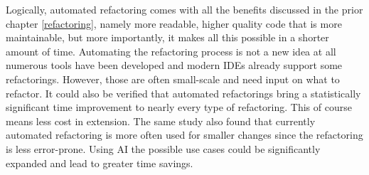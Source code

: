 Logically, automated refactoring comes with all the benefits discussed in the prior chapter \ref{refactoring}, namely more readable, higher quality code that is more maintainable, but more importantly, it makes all this possible in a shorter amount of time. \cite{negara2012using}
Automating the refactoring process is not a new idea at all numerous tools have been developed and modern IDEs already support some refactorings. However, those are often small-scale and need input on what to refactor. \cite{usedisuserefactor}
It could also be verified that automated refactorings bring a statistically significant time improvement to nearly every type of refactoring. \cite{negara2013comparative} This of course means less cost in extension. The same study also found that currently automated refactoring is more often used for smaller changes since the refactoring is less error-prone. 
Using AI the possible use cases could be significantly expanded and lead to greater time savings.